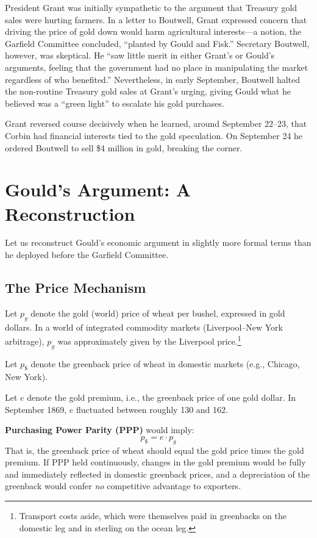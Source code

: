 \documentclass[12pt]{article}
\begin{document}
President Grant was initially sympathetic to the argument that Treasury 
gold sales were hurting farmers. In a letter to Boutwell, Grant expressed 
concern that driving the price of gold down would harm agricultural 
interests---a notion, the Garfield Committee concluded, ``planted by 
Gould and Fisk.'' Secretary Boutwell, however, was skeptical. He ``saw 
little merit in either Grant's or Gould's arguments, feeling that the 
government had no place in manipulating the market regardless of who 
benefited.'' Nevertheless, in early September, Boutwell halted the 
non-routine Treasury gold sales at Grant's urging, giving Gould what he 
believed was a ``green light'' to escalate his gold purchases.

Grant reversed course decisively when he learned, around September 
22--23, that Corbin had financial interests tied to the gold speculation. 
On September 24 he ordered Boutwell to sell \$4 million in gold, breaking 
the corner.

\section{Gould's Argument: A Reconstruction}

Let us reconstruct Gould's economic argument in slightly more formal 
terms than he deployed before the Garfield Committee.

\subsection{The Price Mechanism}

Let $p_g$ denote the gold (world) price of wheat per bushel, expressed in 
gold dollars. In a world of integrated commodity markets (Liverpool--New 
York arbitrage), $p_g$ was approximately given by the Liverpool 
price.\footnote{Transport costs aside, which were themselves paid in 
greenbacks on the domestic leg and in sterling on the ocean leg.}

Let $p_{\$}$ denote the greenback price of wheat in domestic markets 
(e.g., Chicago, New York).

Let $e$ denote the gold premium, i.e., the greenback price of one gold 
dollar. In September 1869, $e$ fluctuated between roughly 130 and 162.

\textbf{Purchasing Power Parity (PPP)} would imply:
\begin{equation}\label{eq:ppp}
    p_{\$} = e \cdot p_g
\end{equation}
That is, the greenback price of wheat should equal the gold price times 
the gold premium. If PPP held continuously, changes in the gold premium 
would be fully and immediately reflected in domestic greenback prices, and 
a depreciation of the greenback would confer \emph{no} competitive 
advantage to exporters.
\end{document}
